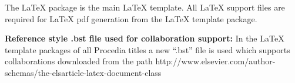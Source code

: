 \documentclass[5p,times,procedia]{Definitions/elsarticle}
\begin{document}
The LaTeX package is the main LaTeX template. All LaTeX support files are required for LaTeX pdf generation from the LaTeX template package. 

{\bf Reference style .bst file used for collaboration support:} In the LaTeX template packages of all Procedia titles a new ``.bst'' file is used which supports collaborations downloaded from the path http://www.elsevier.com/author-schemas/the-elsarticle-latex-document-class
\end{document}
